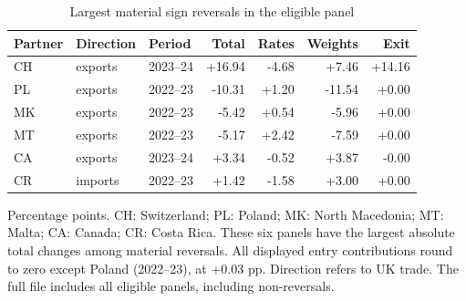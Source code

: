 \begin{table}[!htbp]
\centering
\caption{Largest material sign reversals in the eligible panel}\label{tab:examples}
\small
\begin{tabular}{lllrrrr}
\toprule
Partner & Direction & Period & Total & Rates & Weights & Exit \\
\midrule
CH & exports & 2023--24 & +16.94 & -4.68 & +7.46 & +14.16 \\
PL & exports & 2022--23 & -10.31 & +1.20 & -11.54 & +0.00 \\
MK & exports & 2022--23 & -5.42 & +0.54 & -5.96 & +0.00 \\
MT & exports & 2022--23 & -5.17 & +2.42 & -7.59 & +0.00 \\
CA & exports & 2023--24 & +3.34 & -0.52 & +3.87 & -0.00 \\
CR & imports & 2022--23 & +1.42 & -1.58 & +3.00 & +0.00 \\
\bottomrule
\end{tabular}
\par\vspace{3pt}\begin{minipage}{.97\linewidth}\footnotesize Percentage points. CH: Switzerland; PL: Poland; MK: North Macedonia; MT: Malta; CA: Canada; CR: Costa Rica. These six panels have the largest absolute total changes among material reversals. All displayed entry contributions round to zero except Poland (2022--23), at +0.03 pp. Direction refers to UK trade. The full file includes all eligible panels, including non-reversals.\end{minipage}
\end{table}
